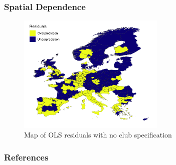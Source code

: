 \documentclass{beamer}
\begin{document}
\begin{frame}
  \frametitle{Spatial Dependence}
  \begin{figure}%
    \centering
    \includegraphics[width=7cm]{residuals_OLS.png}
    \caption{Map of OLS residuals with no club specification}%
    \label{fig:residuals}%
  \end{figure}
\end{frame}



\begin{frame}[allowframebreaks]
  \frametitle{References}
  \printbibliography
\end{frame}
\end{document}
